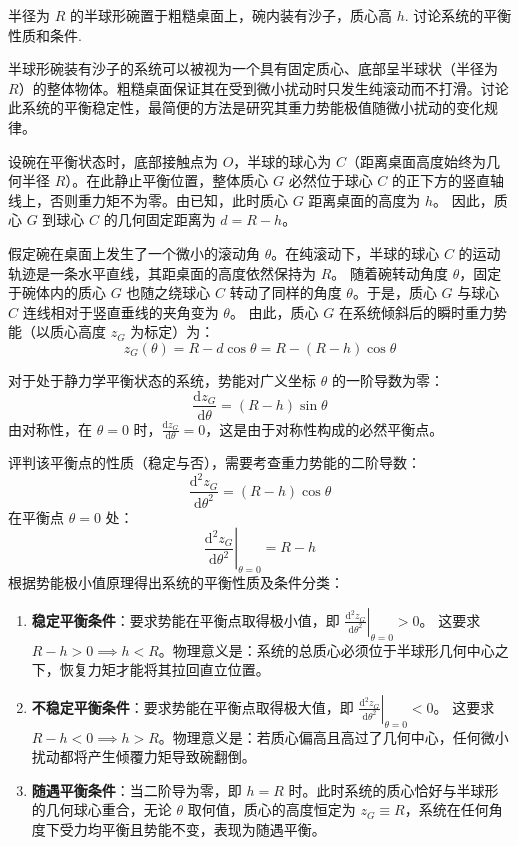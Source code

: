 \begin{exercise}\label{ex:6.12}
半径为 $R$ 的半球形碗置于粗糙桌面上，碗内装有沙子，质心高 $h$. 讨论系统的平衡性质和条件.
\end{exercise}
\begin{solution}
半球形碗装有沙子的系统可以被视为一个具有固定质心、底部呈半球状（半径为 $R$）的整体物体。粗糙桌面保证其在受到微小扰动时只发生纯滚动而不打滑。讨论此系统的平衡稳定性，最简便的方法是研究其重力势能极值随微小扰动的变化规律。

设碗在平衡状态时，底部接触点为 $O$，半球的球心为 $C$（距离桌面高度始终为几何半径 $R$）。在此静止平衡位置，整体质心 $G$ 必然位于球心 $C$ 的正下方的竖直轴线上，否则重力矩不为零。由已知，此时质心 $G$ 距离桌面的高度为 $h$。
因此，质心 $G$ 到球心 $C$ 的几何固定距离为 $d = R - h$。

假定碗在桌面上发生了一个微小的滚动角 $\theta$。在纯滚动下，半球的球心 $C$ 的运动轨迹是一条水平直线，其距桌面的高度依然保持为 $R$。
随着碗转动角度 $\theta$，固定于碗体内的质心 $G$ 也随之绕球心 $C$ 转动了同样的角度 $\theta$。于是，质心 $G$ 与球心 $C$ 连线相对于竖直垂线的夹角变为 $\theta$。
由此，质心 $G$ 在系统倾斜后的瞬时重力势能（以质心高度 $z_G$ 为标定）为：
$$ z_G(\theta) = R - d \cos\theta = R - (R - h) \cos\theta $$

对于处于静力学平衡状态的系统，势能对广义坐标 $\theta$ 的一阶导数为零：
$$ \frac{\mathrm{d}z_G}{\mathrm{d}\theta} = (R - h) \sin\theta $$
由对称性，在 $\theta = 0$ 时，$\frac{\mathrm{d}z_G}{\mathrm{d}\theta} = 0$，这是由于对称性构成的必然平衡点。

评判该平衡点的性质（稳定与否），需要考查重力势能的二阶导数：
$$ \frac{\mathrm{d}^2 z_G}{\mathrm{d}\theta^2} = (R - h) \cos\theta $$
在平衡点 $\theta = 0$ 处：
$$ \left. \frac{\mathrm{d}^2 z_G}{\mathrm{d}\theta^2} \right|_{\theta=0} = R - h $$
根据势能极小值原理得出系统的平衡性质及条件分类：
\begin{enumerate}
    \item \textbf{稳定平衡条件}：要求势能在平衡点取得极小值，即 $\left. \frac{\mathrm{d}^2 z_G}{\mathrm{d}\theta^2} \right|_{\theta=0} > 0$。
    这要求 $R - h > 0 \implies h < R$。物理意义是：系统的总质心必须位于半球形几何中心之下，恢复力矩才能将其拉回直立位置。
    \item \textbf{不稳定平衡条件}：要求势能在平衡点取得极大值，即 $\left. \frac{\mathrm{d}^2 z_G}{\mathrm{d}\theta^2} \right|_{\theta=0} < 0$。
    这要求 $R - h < 0 \implies h > R$。物理意义是：若质心偏高且高过了几何中心，任何微小扰动都将产生倾覆力矩导致碗翻倒。
    \item \textbf{随遇平衡条件}：当二阶导为零，即 $h = R$ 时。此时系统的质心恰好与半球形的几何球心重合，无论 $\theta$ 取何值，质心的高度恒定为 $z_G \equiv R$，系统在任何角度下受力均平衡且势能不变，表现为随遇平衡。
\end{enumerate}
\end{solution}


